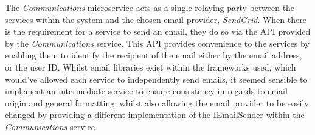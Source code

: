 The \textit{Communications} microservice acts as a single relaying party between the services within the system and the chosen email provider, \textit{SendGrid}. When there is the requirement for a service to send an email, they do so via the API provided by the \textit{Communications} service.  This API provides convenience to the services by enabling them to identify the recipient of the email either by the email address, or the user ID.  Whilst email libraries exist within the frameworks used, which would've allowed each service to independently send emails, it seemed sensible to implement an intermediate service to ensure consistency in regards to email origin and general formatting, whilst also allowing the email provider to be easily changed by providing a different implementation of the IEmailSender within the \textit{Communications} service.
